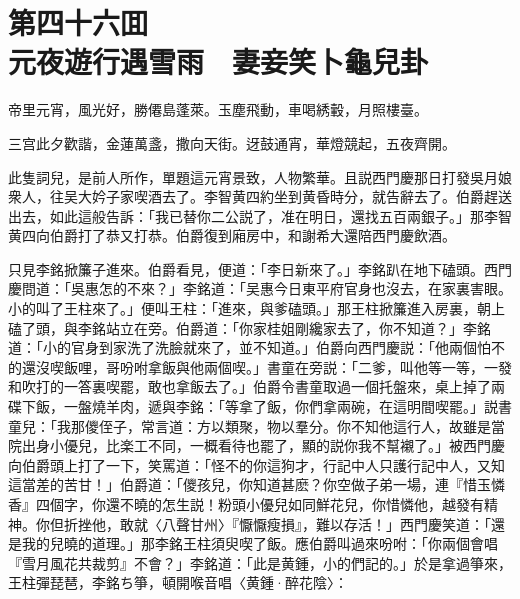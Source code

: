 
\chapter*{第四十六囬　\\元夜遊行遇雪雨　妻妾笑卜龜兒卦}


\begin{myquote}
帝里元宵，風光好，勝僊島蓬萊。玉塵飛動，車喝綉轂，月照樓臺。

三宫此夕歡諧，金蓮萬盞，撒向天街。迓鼓通宵，華燈競起，五夜齊開。
\end{myquote}

此隻詞兒，是前人所作，單題這元宵景致，人物繁華。且説西門慶那日打發吳月娘衆人，往吴大妗子家喫酒去了。李智黄四約坐到黄昏時分，就告辭去了。伯爵趕送出去，如此這般告訴：「我已替你二公説了，准在明日，還找五百兩銀子。」那李智黄四向伯爵打了恭又打恭。伯爵復到廂房中，和謝希大還陪西門慶飲酒。

只見李銘掀簾子進來。伯爵看見，便道：「李日新來了。」李銘趴在地下磕頭。西門慶問道：「吳惠怎的不來？」李銘道：「吴惠今日東平府官身也沒去，在家裏害眼。小的叫了王柱來了。」便叫王柱：「進來，與爹磕頭。」那王柱掀簾進入房裏，朝上磕了頭，與李銘站立在旁。伯爵道：「你家桂姐剛纔家去了，你不知道？」李銘道：「小的官身到家洗了洗臉就來了，並不知道。」伯爵向西門慶説：「他兩個怕不的還沒喫飯哩，哥吩咐拿飯與他兩個喫。」書童在旁説：「二爹，叫他等一等，一發和吹打的一答裏喫罷，敢也拿飯去了。」伯爵令書童取過一個托盤來，桌上掉了兩碟下飯，一盤燒羊肉，遞與李銘：「等拿了飯，你們拿兩碗，在這明間喫罷。」説書童兒：「我那儍侄子，常言道：方以類聚，物以羣分。你不知他這行人，故雖是當院出身小優兒，比楽工不同，一概看待也罷了，顯的説你我不幫襯了。」被西門慶向伯爵頭上打了一下，笑罵道：「怪不的你這狗才，行記中人只護行記中人，又知這當差的苦甘！」伯爵道：「儍孩兒，你知道甚麽？你空做子弟一場，連『惜玉憐香』四個字，你還不曉的怎生説！粉頭小優兒如同鮮花兒，你惜憐他，越發有精神。你但折挫他，敢就〈八聲甘州〉『懨懨瘦損』，難以存活！」西門慶笑道：「還是我的兒曉的道理。」那李銘王柱須臾喫了飯。應伯爵叫過來吩咐：「你兩個會唱『雪月風花共裁剪』不會？」李銘道：「此是黄鍾，小的們記的。」於是拿過箏來，王柱彈琵琶，李銘ち箏，頓開喉音唱〈黄鍾·醉花陰〉：


